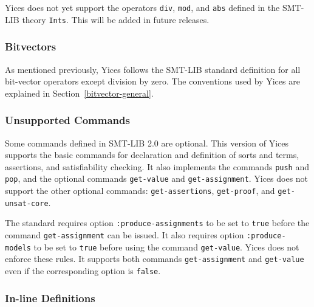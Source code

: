 \documentclass[11pt,twoside,fleqn,openright,titlepage]{cslreport}
\begin{document}
\medskip\noindent Yices does not yet support the operators
\texttt{div}, \texttt{mod}, and \texttt{abs} defined in the SMT-LIB
theory \texttt{Ints}. This will be added in future releases.

\subsubsection*{Bitvectors}

As mentioned previously, Yices follows the SMT-LIB standard definition
for all bit-vector operators except division by zero. The conventions
used by Yices are explained in Section~\ref{bitvector-general}.

\subsubsection*{Unsupported Commands}

Some commands defined in SMT-LIB 2.0 are optional. This version of
Yices supports the basic commands for declaration and definition of
sorts and terms, assertions, and satisfiability checking. It also
implements the commands \texttt{push} and \texttt{pop}, and the
optional commands \texttt{get-value} and \texttt{get-assignment}.
Yices does not support the other optional commands:
\texttt{get-assertions}, \texttt{get-proof}, and
\texttt{get-unsat-core}.

\medskip\noindent
The standard requires option \texttt{:produce-assignments} to be set
to \texttt{true} before the command \texttt{get-assignment} can be
issued.  It also requires option \texttt{:produce-models} to be set to
\texttt{true} before using the command \texttt{get-value}. Yices does
not enforce these rules. It supports both commands
\texttt{get-assignment} and \texttt{get-value} even if the
corresponding option is \texttt{false}.

\subsubsection*{In-line Definitions}
\end{document}
